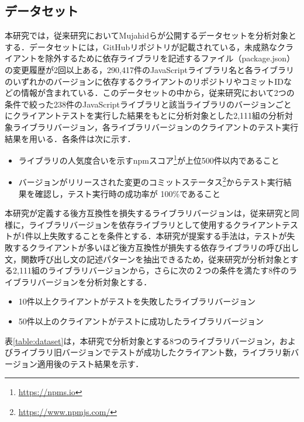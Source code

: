 \documentclass[T,J]{fose} %
\begin{document}
\subsection{データセット}

本研究では，従来研究においてMujahidらが公開するデータセットを分析対象とする．データセットには，GitHubリポジトリが記載されている，未成熟なクライアントを除外するために依存ライブラリを記述するファイル（package.json）の変更履歴が2回以上ある，290,417件のJavaScriptライブラリ名と各ライブラリのいずれかのバージョンに依存するクライアントのリポジトリやコミットIDなどの情報が含まれている．このデータセットの中から，従来研究\cite{matsuda}において2つの条件で絞った238件のJavaScriptライブラリと該当ライブラリのバージョンごとにクライアントテストを実行した結果をもとに分析対象とした2,111組の分析対象ライブラリバージョン，各ライブラリバージョンのクライアントのテスト実行結果を用いる．各条件は次に示す．

\begin{itemize}
\item ライブラリの人気度合いを示すnpmスコア\footnote{\url{https://npms.io}}が上位500件以内であること
\item バージョンがリリースされた変更のコミットステータス\footnote{\url{https://www.npmjs.com/}}からテスト実行結果を確認し，テスト実行時の成功率が 100\%であること
\end{itemize}


本研究が定義する後方互換性を損失するライブラリバージョンは，従来研究\cite{mujahid}と同様に，ライブラリバージョンを依存ライブラリとして使用するクライアントテストが1件以上失敗することを条件とする．本研究が提案する手法は，テストが失敗するクライアントが多いほど後方互換性が損失する依存ライブラリの呼び出し文，関数呼び出し文の記述パターンを抽出できるため，従来研究\cite{matsuda}が分析対象とする2,111組のライブラリバージョンから，さらに次の２つの条件を満たす8件のライブラリバージョンを分析対象とする．
\begin{itemize}
\item 10件以上クライアントがテストを失敗したライブラリバージョン
\item 50件以上のクライアントがテストに成功したライブラリバージョン
\end{itemize}
表\ref{table:dataset}は，本研究で分析対象とする8つのライブラリバージョン，およびライブラリ旧バージョンでテストが成功したクライアント数，ライブラリ新バージョン適用後のテスト結果を示す．
\end{document}
